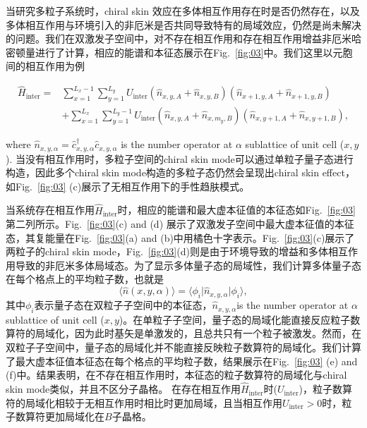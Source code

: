 \documentclass[longbibliography, aps, prx, amsmath, amssymb, amsfonts, twocolumn,superscriptaddress, footinbib]{revtex4-1}
\begin{document}
	当研究多粒子系统时，chiral skin 效应在多体相互作用存在时是否仍然存在，以及多体相互作用与环境引入的非厄米是否共同导致特有的局域效应，仍然是尚未解决的问题。我们在双激发子空间中，对不存在相互作用和存在相互作用增益非厄米哈密顿量进行了计算，相应的能谱和本征态展示在Fig.~\ref{fig:03}中。我们这里以元胞间的相互作用为例
	\begin{widetext}
		\begin{align}
			\hat{H}_{\text{inter}} = &\sum_{{x}=1}^{L_{x}-1} \sum_{{y}=1}^{L_{y}}  U_{\text{inter}} \left(\hat{n}_{{x}, {y}, A}+\hat{n}_{{x}, {y}, B}\right) \left(\hat{n}_{{x}+1, {y}, A}+\hat{n}_{{x}+1, {y}, B}\right)\\
			& + 
			\sum_{{x}=1}^{L_{x}} \sum_{{y}=1}^{L_{y}-1}  U_{\text{inter}} \left(\hat{n}_{{x}, {y}, A}+\hat{n}_{{x}, m_y, B}\right) \left(\hat{n}_{{x}, {y}+1, A}+\hat{n}_{{x}, {y}+1, B}\right),
		\end{align}
	\end{widetext}
	where $\hat{n}_{{x},{y},\alpha}=\hat{c}_{x,y,\alpha}^{\dagger}\hat{c}_{x,y,\alpha}$ is the number operator at $\alpha$ sublattice of unit cell (${x},{y}$).
	当没有相互作用时，多粒子空间的chiral skin mode可以通过单粒子量子态进行构造，因此多个chiral skin mode构造的多粒子态仍然会呈现出chiral skin effect，如Fig.~\ref{fig:03} (c)展示了无相互作用下的手性趋肤模式。

	当系统存在相互作用$\hat{H}_{\text{inter}}$时，相应的能谱和最大虚本征值的本征态如Fig.~\ref{fig:03}第二列所示。Fig.~\ref{fig:03}(c) and (d) 展示了双激发子空间中最大虚本征值的本征态，其复能量在Fig.~\ref{fig:03}(a) and (b)中用橘色十字表示。Fig.~\ref{fig:03}(c)展示了两粒子的chiral skin mode，Fig.~\ref{fig:03}(d)则是由于环境导致的增益和多体相互作用导致的非厄米多体局域态。为了显示多体量子态的局域性，我们计算多体量子态在每个格点上的平均粒子数，也就是
	\begin{equation}
		\langle \hat{n}(x,y,\alpha) \rangle = \langle \phi_i \vert \hat{n}_{x,y,\alpha} \vert \phi_i \rangle,
	\end{equation}
	其中$\phi_i$表示量子态在双粒子子空间中的本征态，$\hat{n}_{x,y,\alpha}$is the number operator at $\alpha$ sublattice of unit cell (${x},{y}$)。在单粒子子空间，量子态的局域化能直接反应粒子数算符的局域化，因为此时基矢是单激发的，且总共只有一个粒子被激发。然而，在双粒子子空间中，量子态的局域化并不能直接反映粒子数算符的局域化。我们计算了最大虚本征值本征态在每个格点的平均粒子数，结果展示在Fig.~\ref{fig:03} (e) and (f)中。结果表明，在不存在相互作用时，本征态的粒子数算符的局域化与chiral skin mode类似，并且不区分子晶格。
	在存在相互作用$\hat{H}_{\text{inter}}$时($U_{\text{inter}}$)，粒子数算符的局域化相较于无相互作用时相比时更加局域，且当相互作用$U_{\text{inter}}>0$时，粒子数算符更加局域化在$B$子晶格。
\end{document}
